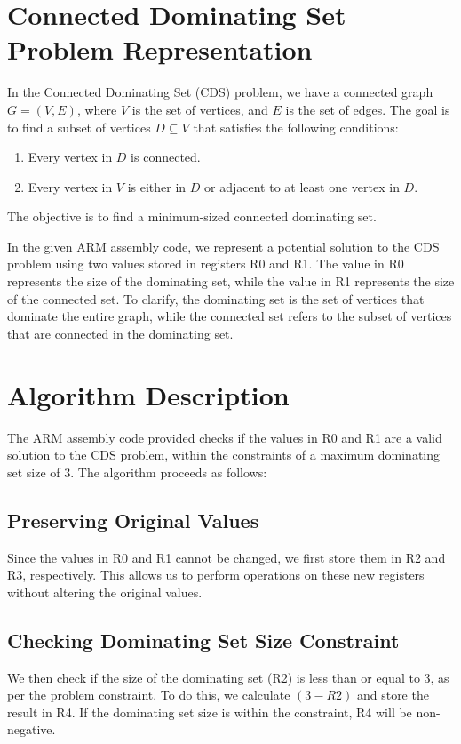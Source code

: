 \section{Connected Dominating Set Problem Representation}
In the Connected Dominating Set (CDS) problem, we have a connected graph $G = (V, E)$, where $V$ is the set of vertices, and $E$ is the set of edges. The goal is to find a subset of vertices $D \subseteq V$ that satisfies the following conditions:
\begin{enumerate}
    \item Every vertex in $D$ is connected.
    \item Every vertex in $V$ is either in $D$ or adjacent to at least one vertex in $D$.
\end{enumerate}
The objective is to find a minimum-sized connected dominating set.

In the given ARM assembly code, we represent a potential solution to the CDS problem using two values stored in registers R0 and R1. The value in R0 represents the size of the dominating set, while the value in R1 represents the size of the connected set. To clarify, the dominating set is the set of vertices that dominate the entire graph, while the connected set refers to the subset of vertices that are connected in the dominating set.

\section{Algorithm Description}
The ARM assembly code provided checks if the values in R0 and R1 are a valid solution to the CDS problem, within the constraints of a maximum dominating set size of 3. The algorithm proceeds as follows:

\subsection{Preserving Original Values}
Since the values in R0 and R1 cannot be changed, we first store them in R2 and R3, respectively. This allows us to perform operations on these new registers without altering the original values.

\subsection{Checking Dominating Set Size Constraint}
We then check if the size of the dominating set (R2) is less than or equal to 3, as per the problem constraint. To do this, we calculate $(3 - R2)$ and store the result in R4. If the dominating set size is within the constraint, R4 will be non-negative.

